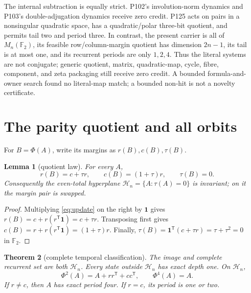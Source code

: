 \documentclass[10pt,a4paper]{amsart}
\newtheorem{theorem}{Theorem}[section]
\newtheorem{lemma}[theorem]{Lemma}
\theoremstyle{definition}
\theoremstyle{remark}
\newcommand{\F}{\mathbb F_2}
\newcommand{\one}{\mathbf 1}
\begin{document}
The internal subtraction is equally strict.  P102's involution-norm dynamics
and P103's double-adjugation dynamics receive zero credit.  P125 acts on pairs
in a nonsingular quadratic space, has a quadratic/polar three-bit quotient,
and permits tail two and period three.  In contrast, the present carrier is
all of $M_n(\F)$, its feasible row/column-margin quotient has dimension
$2n-1$, its tail is at most one, and its recurrent periods are only
$1,2,4$.  Thus the literal systems are not conjugate; generic quotient,
matrix, quadratic-map, cycle, fibre, component, and zeta packaging still
receive zero credit.  A bounded formula-and-owner search found no literal-map
match; a bounded non-hit is not a novelty certificate.

\section{The parity quotient and all orbits}

For $B=\Phi(A)$, write its margins as $r(B),c(B),\tau(B)$.

\begin{lemma}[quotient law]\label{lem:quotient}
For every $A$,
\begin{equation}
 r(B)=c+\tau r,\qquad c(B)=(1+\tau)r,\qquad \tau(B)=0.   \label{eq:quotient}
\end{equation}
Consequently the even-total hyperplane
$\mathcal H_n=\{A:\tau(A)=0\}$ is invariant; on it the margin pair is
swapped.
\end{lemma}

\begin{proof}
Multiplying \eqref{eq:update} on the right by $\one$ gives
$r(B)=c+r(r^{\mathsf T}\one)=c+\tau r$.  Transposing first gives
$c(B)=r+r(r^{\mathsf T}\one)=(1+\tau)r$.  Finally,
$\tau(B)=\one^{\mathsf T}(c+\tau r)=\tau+\tau^2=0$ in
$\F$.
\end{proof}

\begin{theorem}[complete temporal classification]\label{thm:orbits}
The image and complete recurrent set are both $\mathcal H_n$.  Every state
outside $\mathcal H_n$ has exact depth one.  On $\mathcal H_n$,
\begin{equation}
 \Phi^2(A)=A+rr^{\mathsf T}+cc^{\mathsf T},
 \qquad \Phi^4(A)=A.                                  \label{eq:four}
\end{equation}
If $r\ne c$, then $A$ has exact period four.  If $r=c$, its period is one or
two.
\end{theorem}
\end{document}
